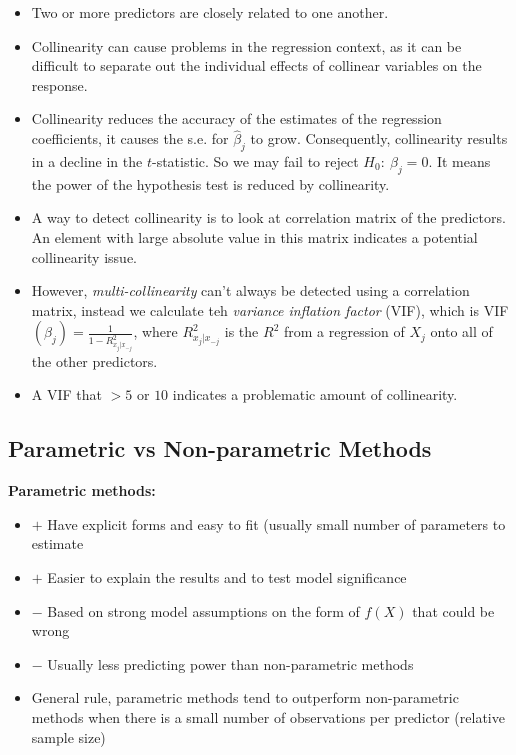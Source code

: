 \documentclass[11pt]{article}
\begin{document}
\begin{itemize}
\begin{itemize}
            \item Two or more predictors are closely related to one another.
            \item Collinearity can cause problems in the regression context, as it can be difficult to separate out the individual effects of collinear variables on the response.
            \item Collinearity reduces the accuracy of the estimates of the regression coefficients, it causes the s.e. for $\hat\beta_j$ to grow. Consequently, collinearity results in a decline in the $t$-statistic. So we may fail to reject $H_0: \ \beta_j = 0$. It means the power of the hypothesis test is reduced by collinearity.
            \item A way to detect collinearity is to look at correlation matrix of the predictors. An element with large absolute value in this matrix indicates a potential collinearity issue.
            \item However, \textit{multi-collinearity} can't always be detected using a correlation matrix, instead we calculate teh \textit{variance inflation factor} (VIF), which is VIF$(\hat\beta_j) = \frac{1}{1 - R^2_{x_j|x_{-j}}}$, where $R^2_{x_j|x_{-j}}$ is the $R^2$ from a regression of $X_j$ onto all of the other predictors.
            \item A VIF that $> 5$ or $10$ indicates a problematic amount of collinearity.
        \end{itemize}
\end{itemize}

\subsection{Parametric vs Non-parametric Methods}
\noindent \textbf{Parametric methods:}
\begin{itemize}
    \item $+$ Have explicit forms and easy to fit (usually small number of parameters to estimate
    \item $+$ Easier to explain the results and to test model significance
    \item $-$ Based on strong model assumptions on the form of $f(X)$ that could be wrong
    \item $-$ Usually less predicting power than non-parametric methods
    \item General rule, parametric methods tend to outperform non-parametric methods when there is a small number of observations per predictor (relative sample size)
\end{itemize} \phantom{i}
\end{document}
